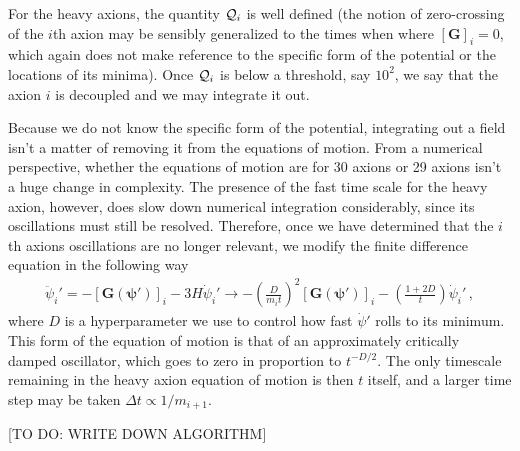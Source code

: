 \documentclass[11pt]{article}
\begin{document}
For the heavy axions, the quantity ${\cal Q}_i$ is well defined (the notion of zero-crossing of the $i$th axion may be sensibly generalized to the times when where $[\bm G]_i = 0$, which again does not make reference to the specific form of the potential or the locations of its minima). Once ${\cal Q}_i$ is below a threshold, say $10^{2}$, we say that the axion $i$ is decoupled and we may integrate it out.

Because we do not know the specific form of the potential, integrating out a field isn't a matter of removing it from the equations of motion. From a numerical perspective, whether the equations of motion are for 30 axions or 29 axions isn't a huge change in complexity. The presence of the fast time scale for the heavy axion, however, does slow down numerical integration considerably, since its oscillations must still be resolved. Therefore, once we have determined that the $i$th axions oscillations are no longer relevant, we modify the finite difference equation in the following way
\begin{align}\label{eqn:critical_damping_modification}
    \ddot\psi_i' = -[\bm G(\bm\psi')]_i - 3 H\dot\psi_i'\to -\left(\frac{D}{m_it}\right)^2[\bm G(\bm\psi')]_i - \left(\frac{1 + 2 D}{t}\right)\dot\psi_i'\,,
\end{align}
where $D$ is a hyperparameter we use to control how fast $\dot\psi'$ rolls to its minimum. This form of the equation of motion is that of an approximately critically damped oscillator, which goes to zero in proportion to $t^{-D/2}$. The only timescale remaining in the heavy axion equation of motion is then $t$ itself, and a larger time step may be taken $\Delta t\propto 1/m_{i + 1}$.

[TO DO: WRITE DOWN ALGORITHM]
\end{document}
